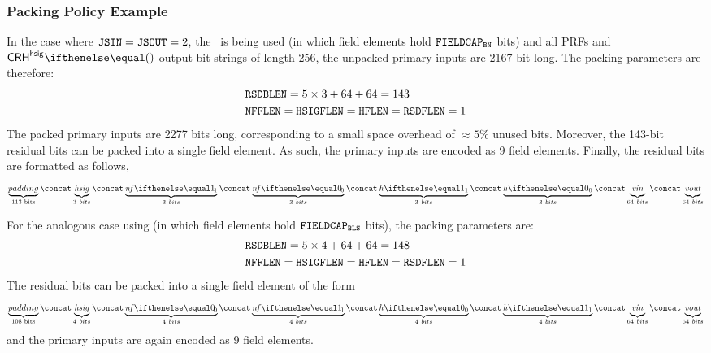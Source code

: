 \subsubsection{Packing Policy Example}

In the case where $\mathtt{JSIN}=\mathtt{JSOUT}=2$, the \BNCurve~is being used (in which field elements hold $\mathtt{FIELDCAP_{BN}}$ bits) and all PRFs and $\crhhsig{}$ output bit-strings of length 256, the unpacked primary inputs are 2167-bit long.
The packing parameters are therefore:
\begin{align*}
    & \mathtt{RSDBLEN} = 5 \times 3 + 64 + 64 = 143 \\
    & \mathtt{NFFLEN} = \mathtt{HSIGFLEN} = \mathtt{HFLEN} = \mathtt{RSDFLEN} = 1
\end{align*}
The packed primary inputs are 2277 bits long, corresponding to a small space overhead of $\approx 5\%$ unused bits. Moreover, the 143-bit residual bits can be packed into a single field element. As such, the primary inputs are encoded as 9 field elements.
Finally, the residual bits are formatted as follows,
\[
    \underbrace{padding}_{\text{113 bits}}
    \concat \underbrace{\hsig}_{3\ bits}
    \concat \underbrace{\nf{1}}_{3\ bits}
    \concat \underbrace{\nf{0}}_{3\ bits}
    \concat \underbrace{\htag{1}}_{3\ bits}
    \concat \underbrace{\htag{0}}_{3\ bits}
    \concat \underbrace{\vin\vphantom{g}}_{64\ bits}
    \concat \underbrace{\vout\vphantom{g}}_{64\ bits}
\]

For the analogous case using \BLSCurve (in which field elements hold $\mathtt{FIELDCAP_{BLS}}$ bits), the packing parameters are:
\begin{align*}
    & \mathtt{RSDBLEN} = 5 \times 4 + 64 + 64 = 148 \\
    & \mathtt{NFFLEN} = \mathtt{HSIGFLEN} = \mathtt{HFLEN} = \mathtt{RSDFLEN} = 1
\end{align*}
The residual bits can be packed into a single field element of the form
\[
    \underbrace{padding}_{\text{108 bits}} \concat \underbrace{\hsig}_{4\ bits} \concat \underbrace{\nf{0}}_{4\ bits} \concat \underbrace{\nf{1}}_{4\ bits} \concat \underbrace{\htag{0}}_{4\ bits} \concat \underbrace{\htag{1}}_{4\ bits} \concat \underbrace{\vin\vphantom{g}}_{64\ bits} \concat \underbrace{\vout\vphantom{g}}_{64\ bits}
\]
and the primary inputs are again encoded as 9 field elements.
